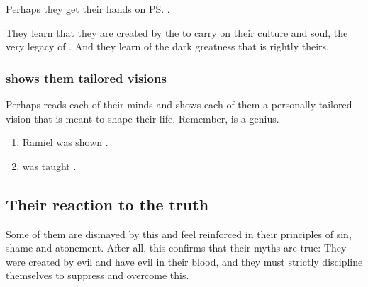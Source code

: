 Perhaps they get their hands on \ps{\Semiza}{} . 

They learn that they are created by the \banes{} to carry on their culture and soul, the very legacy of \Erebos. 
And they learn of the dark greatness that is rightly theirs. 






\subsubsection{\Semiza{} shows them tailored visions}
Perhaps \Semiza{} reads each of their minds and shows each of them a personally tailored vision that is meant to shape their life. 
Remember, \Semiza{} is a genius. 

\begin{enumerate}
  \item 
    Ramiel was shown . 
  \item 
    \Shiaraid{} was taught . 
\end{enumerate}












\subsection{Their reaction to the truth}
Some of them are dismayed by this and feel reinforced in their principles of sin, shame and atonement. 
After all, this confirms that their myths are true: 
They were created by evil and have evil in their blood, and they must strictly discipline themselves to suppress and overcome this. 

